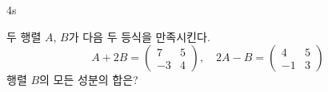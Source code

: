 \documentclass[10pt]{article}
\begin{document}
\begin{pagepair}
\begin{minipage}[t][\probboxheight][t]{0.46\linewidth}
\begin{problem}{4}{s}
\par\smallskip
두 행렬 $A$, $B$가 다음 두 등식을 만족시킨다.
\[ A + 2B = \begin{pmatrix} 7 & 5 \\ -3 & 4 \end{pmatrix},\quad 2A - B = \begin{pmatrix} 4 & 5 \\ -1 & 3 \end{pmatrix} \]
행렬 $B$의 모든 성분의 합은?
\begin{choices}
\end{choices}
\end{problem}
\end{minipage}
\end{pagepair}

\setlength{\probboxheight}{100mm}
\end{document}
